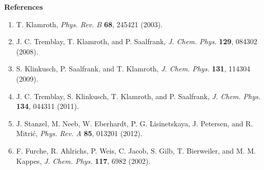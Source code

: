 \documentclass[12pt]{article}
\begin{document}
{\begin{minipage}[c][27cm]{19cm}
{\begin{center}
\textbf{ \color{blblue} References}
\end{center} } \bigskip
\begin{enumerate}
\item T. Klamroth, \emph{Phys. Rev. B} \textbf{68}, 245421 (2003).
\item J. C. Tremblay, T. Klamroth, and P. Saalfrank, \emph{J. Chem. Phys.} \textbf{129}, 084302 (2008).
\item S. Klinkusch, P. Saalfrank, and T. Klamroth, \emph{J. Chem. Phys.} \textbf{131}, 114304 (2009).
\item J. C. Tremblay, S. Klinkusch, T. Klamroth, and P. Saalfrank, \emph{J. Chem. Phys.} \textbf{134}, 044311 (2011).
\item J. Stanzel, M. Neeb, W. Eberhardt, P. G. Lisinetskaya, J. Petersen, and R. Mitri\'c, \emph{Phys. Rev. A} \textbf{85}, 013201 (2012).
\item F. Furche, R. Ahlrichs, P. Weis, C. Jacob, S. Gilb, T. Bierweiler, and M. M. Kappes, \emph{J. Chem. Phys.} {\bfseries 117}, 6982 (2002).
\end{enumerate}


\vspace{1cm}
\end{minipage} }
\vspace{3cm}
\end{document}
